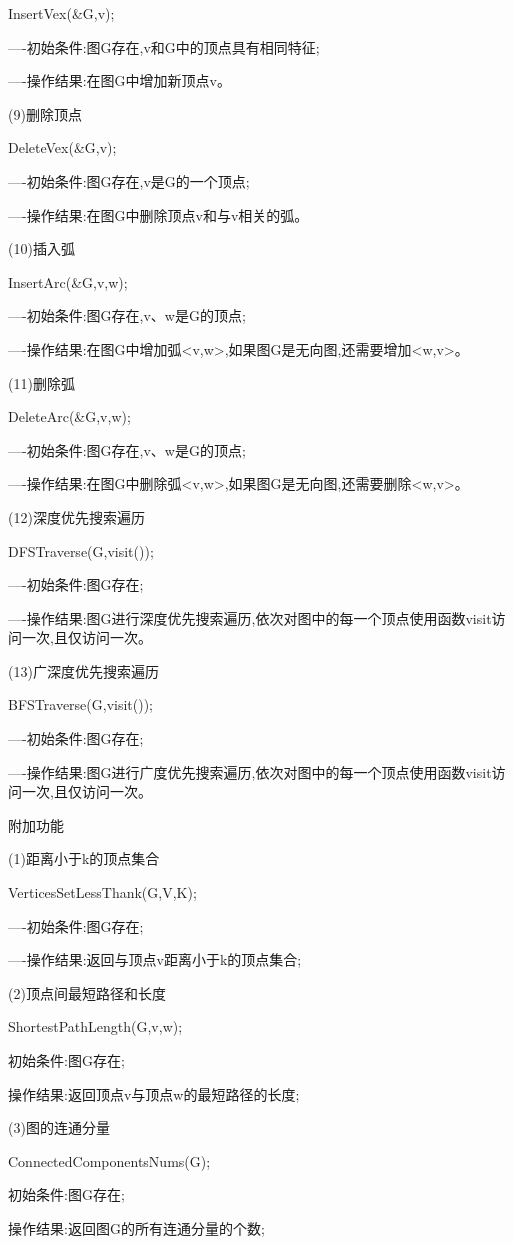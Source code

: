 \documentclass[supercite]{Experimental_Report}
\theoremstyle{definition}
\begin{document}
InsertVex(\&G,v);

----初始条件:图G存在,v和G中的顶点具有相同特征;

----操作结果:在图G中增加新顶点v。

(9)删除顶点

DeleteVex(\&G,v);

----初始条件:图G存在,v是G的一个顶点;

----操作结果:在图G中删除顶点v和与v相关的弧。

(10)插入弧

InsertArc(\&G,v,w);

----初始条件:图G存在,v、w是G的顶点;

----操作结果:在图G中增加弧<v,w>,如果图G是无向图,还需要增加<w,v>。

(11)删除弧

DeleteArc(\&G,v,w);

----初始条件:图G存在,v、w是G的顶点;

----操作结果:在图G中删除弧<v,w>,如果图G是无向图,还需要删除<w,v>。

(12)深度优先搜索遍历

DFSTraverse(G,visit());

----初始条件:图G存在;

----操作结果:图G进行深度优先搜索遍历,依次对图中的每一个顶点使用函数visit访问一次,且仅访问一次。

(13)广深度优先搜索遍历

BFSTraverse(G,visit());

----初始条件:图G存在;

----操作结果:图G进行广度优先搜索遍历,依次对图中的每一个顶点使用函数visit访问一次,且仅访问一次。

附加功能

(1)距离小于k的顶点集合

VerticesSetLessThank(G,V,K);

----初始条件:图G存在;

----操作结果:返回与顶点v距离小于k的顶点集合;

(2)顶点间最短路径和长度

ShortestPathLength(G,v,w); 

初始条件:图G存在;

操作结果:返回顶点v与顶点w的最短路径的长度;

(3)图的连通分量

ConnectedComponentsNums(G);

初始条件:图G存在;

操作结果:返回图G的所有连通分量的个数;
\end{document}
